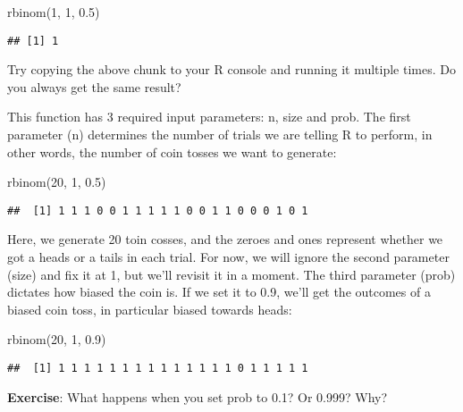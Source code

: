 \documentclass[
]{book}
\newenvironment{Shaded}{\begin{snugshade}}{\end{snugshade}}
\newcommand{\DecValTok}[1]{\textcolor[rgb]{0.00,0.00,0.81}{#1}}
\newcommand{\FloatTok}[1]{\textcolor[rgb]{0.00,0.00,0.81}{#1}}
\newcommand{\FunctionTok}[1]{\textcolor[rgb]{0.00,0.00,0.00}{#1}}
\newcommand{\NormalTok}[1]{#1}
\begin{document}
\begin{Shaded}
\begin{Highlighting}[]
\FunctionTok{rbinom}\NormalTok{(}\DecValTok{1}\NormalTok{, }\DecValTok{1}\NormalTok{, }\FloatTok{0.5}\NormalTok{)}
\end{Highlighting}
\end{Shaded}

\begin{verbatim}
## [1] 1
\end{verbatim}

Try copying the above chunk to your R console and running it multiple times. Do you always get the same result?

This function has 3 required input parameters: n, size and prob. The first parameter (n) determines the number of trials we are telling R to perform, in other words, the number of coin tosses we want to generate:

\begin{Shaded}
\begin{Highlighting}[]
\FunctionTok{rbinom}\NormalTok{(}\DecValTok{20}\NormalTok{, }\DecValTok{1}\NormalTok{, }\FloatTok{0.5}\NormalTok{)}
\end{Highlighting}
\end{Shaded}

\begin{verbatim}
##  [1] 1 1 1 0 0 1 1 1 1 1 0 0 1 1 0 0 0 1 0 1
\end{verbatim}

Here, we generate 20 toin cosses, and the zeroes and ones represent whether we got a heads or a tails in each trial. For now, we will ignore the second parameter (size) and fix it at 1, but we'll revisit it in a moment. The third parameter (prob) dictates how biased the coin is. If we set it to 0.9, we'll get the outcomes of a biased coin toss, in particular biased towards heads:

\begin{Shaded}
\begin{Highlighting}[]
\FunctionTok{rbinom}\NormalTok{(}\DecValTok{20}\NormalTok{, }\DecValTok{1}\NormalTok{, }\FloatTok{0.9}\NormalTok{)}
\end{Highlighting}
\end{Shaded}

\begin{verbatim}
##  [1] 1 1 1 1 1 1 1 1 1 1 1 1 1 1 0 1 1 1 1 1
\end{verbatim}

\textbf{Exercise}: What happens when you set prob to 0.1? Or 0.999? Why?
\end{document}
